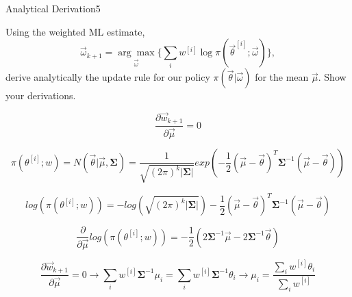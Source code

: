 \begin{questions}


\begin{question}{Analytical Derivation}{5}

Using the weighted ML estimate,
\begin{equation}
    \vec{\omega}_{k+1} = \underset{\vec \omega}{\arg\max} \{ \sum_i w^{[i]} \log \pi(\vec{\theta}^{[i]};\vec{\omega})\},
\end{equation}
derive analytically the update rule for our policy $\pi(\vec{\theta}|\vec{\omega})$ for the mean $\vec{\mu}$. Show your derivations.

\begin{answer}
\begin{equation}
	\frac{\partial \vec{w}_{k+1}}{\partial \vec{\mu}} = 0
\end{equation}

\begin{equation}
 \pi (\theta^{[i]}; w) = N(\vec{\theta}|\vec{\mu},\boldsymbol{\Sigma}) = \frac{1}{\sqrt{(2\pi)^k |\boldsymbol{\Sigma}|}} exp(-\frac{1}{2} (\vec{\mu}-\vec{\theta})^T\boldsymbol{\Sigma}^{-1}(\vec{\mu}-\vec{\theta}))
\end{equation}

\begin{equation}
log(\pi (\theta^{[i]}; w)) = -log(\sqrt{(2\pi)^k|\boldsymbol{\Sigma}| })-\frac{1}{2} (\vec{\mu}-\vec{\theta})^T\boldsymbol{\Sigma}^{-1}(\vec{\mu}-\vec{\theta})
\end{equation}

\begin{equation}
\frac{\partial}{\partial \vec{\mu}}log(\pi (\theta^{[i]}; w)) = -\frac{1}{2}(2 \boldsymbol{\Sigma}^{-1} \vec{\mu} -2\boldsymbol{\Sigma}^{-1} \vec{\theta})
\end{equation}


\begin{equation}
\frac{\partial \vec{w}_{k+1}}{\partial \vec{\mu}} = 0 \rightarrow \sum_i w^{[i]} \boldsymbol{\Sigma}^{-1} {\mu}_i = \sum_i w^{[i]} \boldsymbol{\Sigma}^{-1} \theta_i \rightarrow \mu_i = \frac {\sum_i w^{[i]} \theta_i}{\sum_i w^{[i]}}
\end{equation}

\end{answer}

\end{question}




\end{questions}
